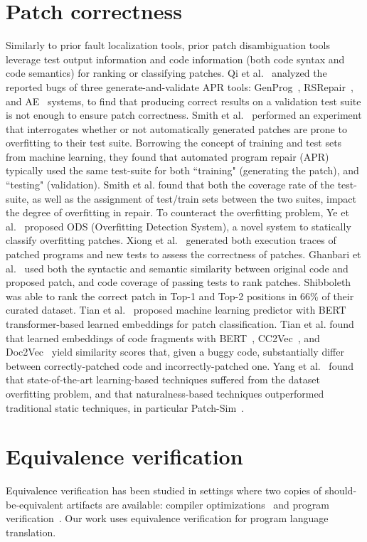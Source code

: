 \documentclass[12pt,openany,oneside,table]{cmuthesis}
\begin{document}
\section{Patch correctness}
Similarly to prior fault localization tools, prior patch disambiguation tools
leverage test output information and code information (both code syntax and code
semantics) for ranking or classifying patches. Qi et al.~\cite{qi2015analysis} analyzed the reported
bugs of three generate-and-validate APR tools: GenProg~\cite{genprog},
RSRepair~\cite{rsrepair}, and AE~\cite{ae} systems, to find that producing
correct results on a validation test suite is not enough to ensure patch
correctness. Smith et al.~\cite{CURE} performed
an experiment that interrogates whether or not automatically generated patches
are prone to overfitting to their test suite. Borrowing the concept of training
and test sets from machine learning, they found that automated program repair
(APR) typically used the same test-suite for both ``training" (generating the
patch), and ``testing" (validation). Smith et al. found that both the coverage
rate of the test-suite, as well as the assignment of test/train sets between the
two suites, impact the degree of overfitting in repair. To counteract the
overfitting problem, Ye et al.~\cite{ye_patches} proposed ODS (Overfitting
Detection System), a novel system to statically classify overfitting patches.
Xiong et al.~\cite{patch-sim} generated both execution traces of patched
programs and new tests to assess the correctness of patches. Ghanbari et
al.~\cite{Shibboleth} used both the syntactic and semantic similarity between
original code and proposed patch, and code coverage of passing tests to rank
patches. Shibboleth~\cite{Shibboleth} was able to rank the correct patch in
Top-1 and Top-2 positions in 66\% of their curated dataset. Tian et
al.~\cite{Panther} proposed machine learning predictor with BERT
transformer-based learned embeddings for patch classification. Tian et al. found
that learned embeddings of code fragments with BERT~\cite{BERT},
CC2Vec~\cite{cc2vec}, and Doc2Vec~\cite{doc2vec} yield similarity scores that,
given a buggy code, substantially differ between correctly-patched code and
incorrectly-patched one. 
Yang et al.~\cite{yang2023large} found that state-of-the-art learning-based techniques suffered from the dataset overfitting problem, and that naturalness-based
techniques outperformed traditional static techniques, in particular
Patch-Sim~\cite{patch-sim}.


\section{Equivalence verification}
Equivalence verification has been studied in settings where two copies
of should-be-equivalent artifacts are available: compiler
optimizations~\cite{churchill_semantic_2019,churchill_sound_2017} and program
verification~\cite{antonopoulos_algebra_2023,kommrusch_self-supervised_2023}. Our
work uses equivalence verification for program language
translation.
\end{document}

